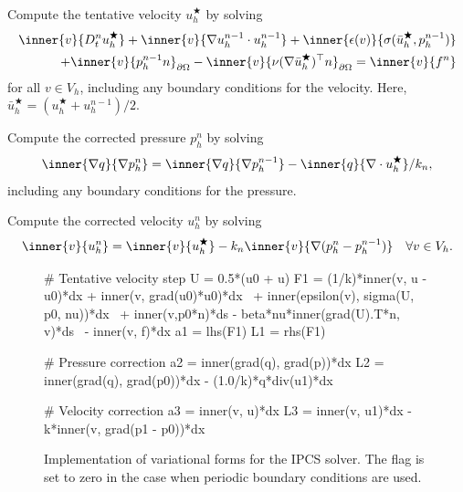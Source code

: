 {
\item
  Compute the tentative velocity $u_h^\bigstar$ by solving
  \begin{equation}\label{eq:ipcs,1}
    \begin{split}
      \inner{v}{D_t^n u_h^{\bigstar}}
      + \inner{v}{\nabla u_h^{n-1} \cdot u_h^{n-1}}
      + \inner{\epsilon(v)}{\sigma(\bar{u}_h^{\bigstar}, p^{n-1}_h)} \\
      + \inner{v}{p^{n-1}_h n}_{\partial\Omega}
      - \inner{v}{\nu (\nabla \bar{u}_h^{\bigstar})^{\top} n}_{\partial\Omega}
      = \inner{v}{f^n}
    \end{split}
  \end{equation}
  for all $v \in V_h$, including any boundary conditions for the
  velocity. Here, $\bar{u}_h^{\bigstar} = (u_h^{\bigstar} + u_h^{n-1}) / 2$.

\item
  Compute the corrected pressure $p_h^n$ by solving
  \begin{equation}\label{eq:ipcs,2}
    \inner{\nabla q}{\nabla p^n_h}
    = \inner{\nabla q}{\nabla p^{n-1}_h} - \inner{q}{\nabla \cdot u_h^{\bigstar}} / k_n,
  \end{equation}
  including any boundary conditions for the pressure.

\item
  Compute the corrected velocity $u_h^n$ by solving
  \begin{equation}\label{eq:ipcs,3}
    \inner{v}{u_h^n} = \inner{v}{u_h^{\bigstar}} - k_n\inner{v}{\nabla(p_h^n-p_h^{n-1})}
    \quad \forall v \in V_h.
  \end{equation}
  \label{ipcs_listing}
}

\begin{figure}[hbp]
  \begin{center}
    \begin{python}
# Tentative velocity step
U = 0.5*(u0 + u)
F1 = (1/k)*inner(v, u - u0)*dx + inner(v, grad(u0)*u0)*dx \
   + inner(epsilon(v), sigma(U, p0, nu))*dx \
   + inner(v,p0*n)*ds - beta*nu*inner(grad(U).T*n, v)*ds \
   - inner(v, f)*dx
a1 = lhs(F1)
L1 = rhs(F1)

# Pressure correction
a2 = inner(grad(q), grad(p))*dx
L2 = inner(grad(q), grad(p0))*dx - (1.0/k)*q*div(u1)*dx

# Velocity correction
a3 = inner(v, u)*dx
L3 = inner(v, u1)*dx - k*inner(v, grad(p1 - p0))*dx
    \end{python}
    \caption{Implementation of variational forms for the IPCS
      solver. The flag \emp{beta = 1} is set to zero in the case when
      periodic boundary conditions are used.}
    \label{fig:IPCS}
  \end{center}
\end{figure}

